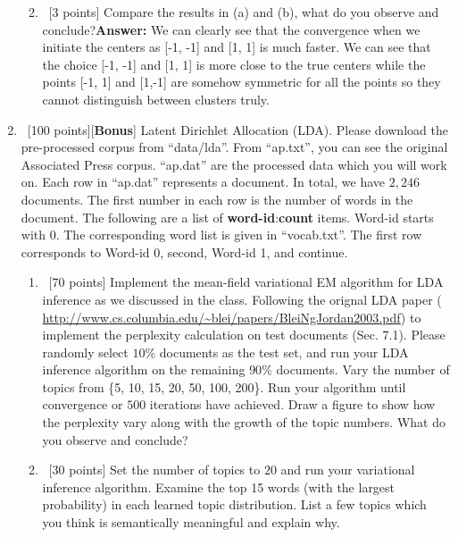 \documentclass[12pt, fullpage,letterpaper]{article}
\def\red{\color{black!30!red}}
\def\blackblue{\color{black!40!blue}}
\begin{document}
\begin{enumerate}
\begin{enumerate}
{}	
\item~[3 points] Compare the results in (a) and (b), what do you observe and conclude?{\bf \red Answer: }{\blackblue 
We can clearly see that the convergence when we initiate the centers as  [-1, -1] and [1, 1] is much faster.  
We can see that the choice [-1, -1] and [1, 1] is more close to the true centers while the points [-1, 1] and [1,-1] are somehow 
symmetric for all the points so they cannot distinguish between clusters truly. 
		}
	\end{enumerate}

	\item~[100 points][\textbf{Bonus}] Latent Dirichlet Allocation (LDA). Please download the pre-processed corpus from ``data/lda''. From ``ap.txt'', you can see the original Associated Press corpus. ``ap.dat'' are the processed data which you will work on. Each row in ``ap.dat'' represents a document. In total, we have $2,246$ documents. The first number in each row is the number of words in the document. The following are a list of  \textbf{word-id}:\textbf{count} items. Word-id starts with 0. The corresponding word list is given in ``vocab.txt''. The first row corresponds to Word-id 0, second, Word-id 1, and continue. 
	
	\begin{enumerate}
		\item~[70 points] Implement the mean-field variational EM algorithm for LDA inference as we discussed in the class. Following the orignal LDA paper ( \url{http://www.cs.columbia.edu/~blei/papers/BleiNgJordan2003.pdf}) to implement the perplexity calculation on test documents (Sec. 7.1). Please randomly select $10\%$ documents as the test set, and run your LDA inference algorithm on the remaining $90\%$ documents. Vary the number of topics from \{5, 10, 15, 20, 50, 100, 200\}. Run your algorithm until convergence or $500$ iterations have achieved. Draw a figure to show how the perplexity vary along with the growth of the topic numbers. What do you observe and conclude?
		\item~[30 points] Set the number of topics to $20$ and run your variational inference algorithm. Examine the top 15 words (\ie with the largest probability) in each learned topic distribution. List a few topics which you think is semantically meaningful and explain why. 
	\end{enumerate}
\end{enumerate}
\end{document}

